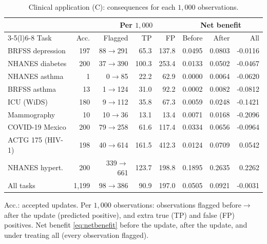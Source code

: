 \begin{table}[!htb]
\centering
\scriptsize
{}
\setlength{\tabcolsep}{2pt}
\caption{Clinical application (C): consequences for each $1{,}000$ observations.}
\label{tab:clinconseq}
\begin{tabular}{@{}lrrrrrrr@{}}
\toprule
 & & \multicolumn{3}{c}{Per $1{,}000$} & \multicolumn{3}{c}{Net benefit} \\
\cmidrule(lr){3-5}\cmidrule(l){6-8}
Task & Acc. & Flagged & TP & FP & Before & After & All \\
\midrule
BRFSS depression & 197 & 88$\to$291 & 65.3 & 137.8 & 0.0495 & 0.0803 & -0.0116 \\
NHANES diabetes & 200 & 37$\to$390 & 100.3 & 253.4 & 0.0133 & 0.0502 & -0.0467 \\
NHANES asthma & 1 & 0$\to$85 & 22.2 & 62.9 & 0.0000 & 0.0064 & -0.0620 \\
BRFSS asthma & 13 & 1$\to$124 & 31.0 & 92.2 & 0.0002 & 0.0082 & -0.0812 \\
ICU (WiDS) & 180 & 9$\to$112 & 35.8 & 67.3 & 0.0059 & 0.0248 & -0.1421 \\
Mammography & 10 & 10$\to$36 & 13.1 & 13.4 & 0.0071 & 0.0168 & -0.2096 \\
COVID-19 Mexico & 200 & 79$\to$258 & 61.6 & 117.4 & 0.0334 & 0.0656 & -0.0964 \\
ACTG 175 (HIV-1) & 198 & 40$\to$614 & 161.5 & 412.3 & 0.0124 & 0.0709 & 0.0542 \\
NHANES hypert. & 200 & 339$\to$661 & 123.7 & 198.8 & 0.1895 & 0.2635 & 0.2262 \\
All tasks & 1,199 & 98$\to$386 & 90.9 & 197.0 & 0.0505 & 0.0921 & -0.0031 \\
\bottomrule
\end{tabular}

\vspace{2pt}
\parbox{\linewidth}{\justifying\scriptsize *Acc.: accepted updates. Per $1{,}000$ observations: observations flagged before$\to$after the update (predicted positive), and extra true (TP) and false (FP) positives. Net benefit \eqref{eq:netbenefit} before the update, after the update, and under treating all (every observation flagged).}
\end{table}
